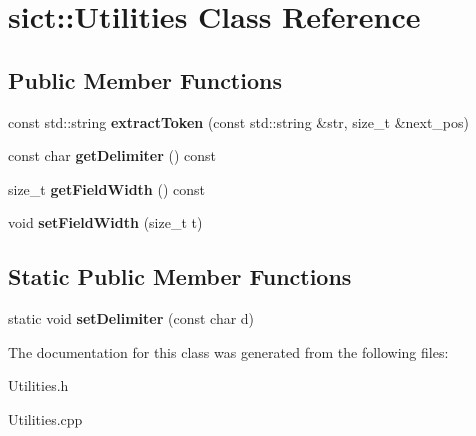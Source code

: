 \hypertarget{classsict_1_1Utilities}{}\section{sict\+::Utilities Class Reference}
\label{classsict_1_1Utilities}
\subsection*{Public Member Functions}
\begin{DoxyCompactItemize}
\item 
\mbox{\label{classsict_1_1Utilities_adf1116c6b7b95d9bfb3f8e1a24065703}} 
const std\+::string {\bfseries extract\+Token} (const std\+::string \&str, size\+\_\+t \&next\+\_\+pos)
\item 
\mbox{\label{classsict_1_1Utilities_acb2dd78a1790aea2af76bda8235d05e0}} 
const char {\bfseries get\+Delimiter} () const
\item 
\mbox{\label{classsict_1_1Utilities_a63f80ab99e3b0f5521d64d24366f59ba}} 
size\+\_\+t {\bfseries get\+Field\+Width} () const
\item 
\mbox{\label{classsict_1_1Utilities_a3c0800c247dd955f57eff973cbe12b0b}} 
void {\bfseries set\+Field\+Width} (size\+\_\+t t)
\end{DoxyCompactItemize}
\subsection*{Static Public Member Functions}
\begin{DoxyCompactItemize}
\item 
\mbox{\label{classsict_1_1Utilities_aebf6a66e41ce8de47d0a8aa7a4e6165b}} 
static void {\bfseries set\+Delimiter} (const char d)
\end{DoxyCompactItemize}


The documentation for this class was generated from the following files\+:\begin{DoxyCompactItemize}
\item 
Utilities.\+h\item 
Utilities.\+cpp\end{DoxyCompactItemize}
